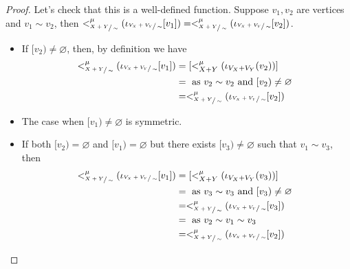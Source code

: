 \begin{proof}
    Let's check that this is a well-defined function.
    Suppose $v_1, v_2$ are vertices and $v_1 \sim v_2$, then $<_{\sfrac{X+Y}{\sim}}^{\mu}(\iota_{\sfrac{V_{X}+V_{Y}}{\sim}}[v_1]) = <_{\sfrac{X+Y}{\sim}}^{\mu}(\iota_{\sfrac{V_{X} + V_{Y}}{\sim}}[v_2])$.
    \begin{itemize}
        \item If $[v_2) \not = \varnothing$, then, by definition we have
                \begin{align*}
                    <_{\sfrac{X+Y}{\sim}}^{\mu}(\iota_{\sfrac{V_{X}+V_{Y}}{\sim}}[v_1]) &= [<_{X+Y}^{\mu}(\iota_{V_{X} + V_{Y}}(v_2))]\\
                     &= \text{ as $v_2 \sim v_2$ and $[v_2) \not = \varnothing$ }\\
                     &= <_{\sfrac{X+Y}{\sim}}^{\mu}(\iota_{\sfrac{V_{X}+V_{Y}}{\sim}}[v_2])
                \end{align*}
        \item The case when $[v_1) \not = \varnothing$ is symmetric.
        \item If both $[v_2) = \varnothing$ and $[v_1) = \varnothing$ but there exists $[v_3) \not = \varnothing$ such that $v_1 \sim v_3$, then
        \begin{align*}
            <_{\sfrac{X+Y}{\sim}}^{\mu}(\iota_{\sfrac{V_{X}+V_{Y}}{\sim}}[v_1]) &= [<_{X+Y}^{\mu}(\iota_{V_{X} + V_{Y}}(v_3))]\\
             &= \text{ as $v_3 \sim v_3$ and $[v_3) \not = \varnothing$ }\\
             &= <_{\sfrac{X+Y}{\sim}}^{\mu}(\iota_{\sfrac{V_{X}+V_{Y}}{\sim}}[v_3])\\
             &= \text{ as $v_2 \sim v_1 \sim v_3$}\\
             &= <_{\sfrac{X+Y}{\sim}}^{\mu}(\iota_{\sfrac{V_{X}+V_{Y}}{\sim}}[v_2])
        \end{align*}
    \end{itemize}

\end{proof}
